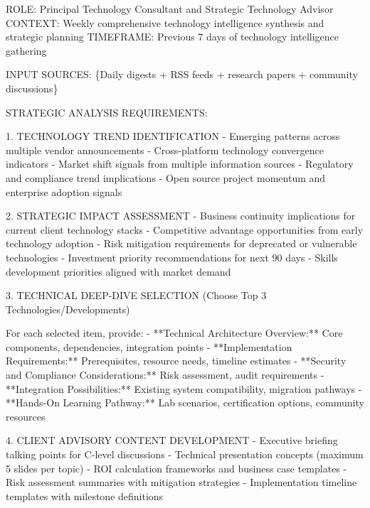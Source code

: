 \documentclass[
  letterpaper,
  DIV=11,
  numbers=noendperiod]{scrartcl}
\newenvironment{Shaded}{\begin{snugshade}}{\end{snugshade}}
\newcommand{\NormalTok}[1]{\textcolor[rgb]{0.00,0.23,0.31}{#1}}
\begin{document}
\begin{Shaded}
\begin{Highlighting}[]
\NormalTok{ROLE: Principal Technology Consultant and Strategic Technology Advisor}
\NormalTok{CONTEXT: Weekly comprehensive technology intelligence synthesis and strategic planning}
\NormalTok{TIMEFRAME: Previous 7 days of technology intelligence gathering}

\NormalTok{INPUT SOURCES: \{Daily digests + RSS feeds + research papers + community discussions\}}

\NormalTok{STRATEGIC ANALYSIS REQUIREMENTS:}

\NormalTok{1. TECHNOLOGY TREND IDENTIFICATION}
\NormalTok{   {-} Emerging patterns across multiple vendor announcements}
\NormalTok{   {-} Cross{-}platform technology convergence indicators}
\NormalTok{   {-} Market shift signals from multiple information sources}
\NormalTok{   {-} Regulatory and compliance trend implications}
\NormalTok{   {-} Open source project momentum and enterprise adoption signals}

\NormalTok{2. STRATEGIC IMPACT ASSESSMENT}
\NormalTok{   {-} Business continuity implications for current client technology stacks}
\NormalTok{   {-} Competitive advantage opportunities from early technology adoption}
\NormalTok{   {-} Risk mitigation requirements for deprecated or vulnerable technologies}
\NormalTok{   {-} Investment priority recommendations for next 90 days}
\NormalTok{   {-} Skills development priorities aligned with market demand}

\NormalTok{3. TECHNICAL DEEP{-}DIVE SELECTION (Choose Top 3 Technologies/Developments)}
   
\NormalTok{   For each selected item, provide:}
\NormalTok{   {-} **Technical Architecture Overview:** Core components, dependencies, integration points}
\NormalTok{   {-} **Implementation Requirements:** Prerequisites, resource needs, timeline estimates}
\NormalTok{   {-} **Security and Compliance Considerations:** Risk assessment, audit requirements}
\NormalTok{   {-} **Integration Possibilities:** Existing system compatibility, migration pathways}
\NormalTok{   {-} **Hands{-}On Learning Pathway:** Lab scenarios, certification options, community resources}

\NormalTok{4. CLIENT ADVISORY CONTENT DEVELOPMENT}
\NormalTok{   {-} Executive briefing talking points for C{-}level discussions}
\NormalTok{   {-} Technical presentation concepts (maximum 5 slides per topic)}
\NormalTok{   {-} ROI calculation frameworks and business case templates}
\NormalTok{   {-} Risk assessment summaries with mitigation strategies}
\NormalTok{   {-} Implementation timeline templates with milestone definitions}


\end{Highlighting}
\end{Shaded}
\end{document}
